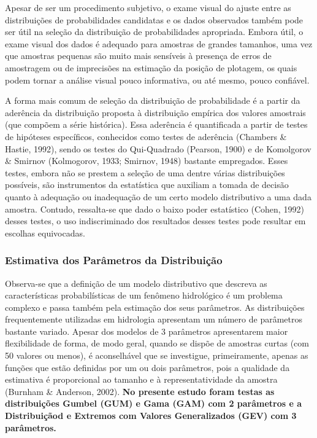 \documentclass[
]{agujournal2019}
\begin{document}
Apesar de ser um procedimento subjetivo, o exame visual do ajuste entre
as distribuições de probabilidades candidatas e os dados observados
também pode ser útil na seleção da distribuição de probabilidades
apropriada. Embora útil, o exame visual dos dados é adequado para
amostras de grandes tamanhos, uma vez que amostras pequenas são muito
mais sensíveis à presença de erros de amostragem ou de imprecisões na
estimação da posição de plotagem, os quais podem tornar a análise visual
pouco informativa, ou até mesmo, pouco confiável.

A forma mais comum de seleção da distribuição de probabilidade é a
partir da aderência da distribuição proposta à distribuição empírica dos
valores amostrais (que compõem a série histórica). Essa aderência é
quantificada a partir de testes de hipóteses específicos, conhecidos
como testes de aderência (Chambers \& Hastie, 1992), sendo os testes do
Qui-Quadrado (Pearson, 1900) e de Komolgorov \& Smirnov (Kolmogorov,
1933; Smirnov, 1948) bastante empregados. Esses testes, embora não se
prestem a seleção de uma dentre várias distribuições possíveis, são
instrumentos da estatística que auxiliam a tomada de decisão quanto à
adequação ou inadequação de um certo modelo distributivo a uma dada
amostra. Contudo, ressalta-se que dado o baixo poder estatístico (Cohen,
1992) desses testes, o uso indiscriminado dos resultados desses testes
pode resultar em escolhas equivocadas.

\subsubsection{Estimativa dos Parâmetros da
Distribuição}\label{estimativa-dos-paruxe2metros-da-distribuiuxe7uxe3o}

Observa-se que a definição de um modelo distributivo que descreva as
características probabilísticas de um fenômeno hidrológico é um problema
complexo e passa também pela estimação dos seus parâmetros. As
distribuições frequentemente utilizadas em hidrologia apresentam um
número de parâmetros bastante variado. Apesar dos modelos de 3
parâmetros apresentarem maior flexibilidade de forma, de modo geral,
quando se dispõe de amostras curtas (com 50 valores ou menos), é
aconselhável que se investigue, primeiramente, apenas as funções que
estão definidas por um ou dois parâmetros, pois a qualidade da
estimativa é proporcional ao tamanho e à representatividade da amostra
(Burnham \& Anderson, 2002). \textbf{No presente estudo foram testas as
distribuições Gumbel (GUM) e Gama (GAM) com 2 parâmetros e a
Distribuiçãod e Extremos com Valores Generalizados (GEV) com 3
parâmetros.}
\end{document}
